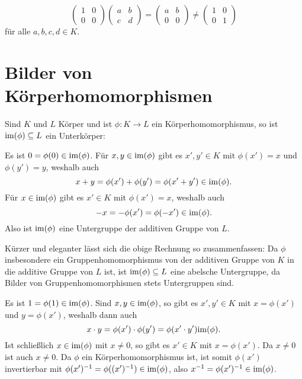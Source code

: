 \begin{enumerate}[leftmargin=*]
  \[
   \begin{pmatrix}
    1 & 0 \\
    0 & 0
   \end{pmatrix}
   \begin{pmatrix}
    a & b \\
    c & d
   \end{pmatrix}
   =
   \begin{pmatrix}
    a & b \\
    0 & 0
   \end{pmatrix}
   \neq
   \begin{pmatrix}
    1 & 0 \\
    0 & 1
   \end{pmatrix}
  \]
  für alle $a,b,c,d \in K$.
\end{enumerate}



\section{Bilder von Körperhomomorphismen}
Sind $K$ und $L$ Körper und ist $\phi \colon K \to L$ ein Körperhomomorphismus, so ist $\mathrm{im}(\phi) \subseteq L$ ein Unterkörper:

Es ist $0 = \phi(0) \in \mathrm{im}(\phi)$. Für $x,y \in \mathrm{im}(\phi)$ gibt es $x', y' \in K$ mit $\phi(x') = x$ und $\phi(y') = y$, weshalb auch
\[
 x+y
 = \phi(x')+\phi(y')
 = \phi(x'+y')
 \in \mathrm{im}(\phi).
\]
Für $x \in \mathrm{im}(\phi)$ gibt es $x' \in K$ mit $\phi(x') = x$, weshalb auch
\[
 -x
 = -\phi(x')
 = \phi(-x') \in \mathrm{im}(\phi).
\]
Also ist $\mathrm{im}(\phi)$ eine Untergruppe der additiven Gruppe von $L$.

\begin{bem}
 Kürzer und eleganter lässt sich die obige Rechnung so zusammenfassen: Da $\phi$ insbesondere ein Gruppenhomomorphismus von der additiven Gruppe von $K$ in die additive Gruppe von $L$ ist, ist $\mathrm{im}(\phi) \subseteq L$ eine abelsche Untergruppe, da Bilder von Gruppenhomomorphismen stets Untergruppen sind. 
\end{bem}

Es ist $1 = \phi(1) \in \mathrm{im}(\phi)$. Sind $x,y \in \mathrm{im}(\phi)$, so gibt es $x',y' \in K$ mit $x = \phi(x')$ und $y = \phi(x')$, weshalb dann auch
\[
 x \cdot y = \phi(x') \cdot \phi(y') = \phi(x' \cdot y') \mathrm{im}(\phi).
\]
Ist schließlich $x \in \mathrm{im}(\phi)$ mit $x \neq 0$, so gibt es $x' \in K$ mit $x = \phi(x')$. Da $x \neq 0$ ist auch $x \neq 0$. Da $\phi$ ein Körperhomomorphismus ist, ist somit $\phi(x')$ invertierbar mit $\phi(x')^{-1} = \phi((x')^{-1}) \in \mathrm{im}(\phi)$, also $x^{-1} = \phi(x')^{-1} \in \mathrm{im}(\phi)$.

